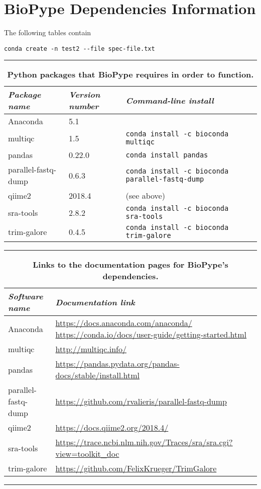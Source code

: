 %
\section{BioPype Dependencies Information}
The following tables contain 

\verb|conda create -n test2 --file spec-file.txt|

%
\begin{table}[hbtp]
    \begin{maxipage}
    \caption{\textbf{Python packages that BioPype requires in order to function.}}
    \hrule
    \begin{tabular}{ l | l | l l }
        \textit{Package name} & \textit{Version number} & \textit{Command-line install} \\ 
        \hline
        Anaconda & 5.1 &  \\  
        multiqc & 1.5 & \verb|conda install -c bioconda multiqc| \\
        pandas & 0.22.0 & \verb|conda install pandas| \\
        parallel-fastq-dump & 0.6.3 & \verb|conda install -c bioconda parallel-fastq-dump| \\
        qiime2 & 2018.4 & (see above) \\
        sra-tools & 2.8.2 & \verb|conda install -c bioconda sra-tools| \\
        trim-galore & 0.4.5 & \verb|conda install -c bioconda trim-galore| & \\
    \end{tabular}
    \label{tab:software}
    \label{software}
    \hrule
    \end{maxipage}
\end{table}
%
\begin{table}[hbtp]
\begin{maxipage}
\caption{\textbf{Links to the documentation pages for BioPype's dependencies.}}
\begin{tabular}{ l | p{12.25cm} }
\textit{Software name} & \textit{Documentation link} \\
\hline
Anaconda & \url{https://docs.anaconda.com/anaconda/} \newline \url{https://conda.io/docs/user-guide/getting-started.html} \\
multiqc & \url{http://multiqc.info/} \\
pandas & \url{https://pandas.pydata.org/pandas-docs/stable/install.html} \\
parallel-fastq-dump & \url{https://github.com/rvalieris/parallel-fastq-dump} \\
qiime2 & \url{https://docs.qiime2.org/2018.4/} \\
sra-tools & \url{https://trace.ncbi.nlm.nih.gov/Traces/sra/sra.cgi?view=toolkit_doc} \\
trim-galore &  \url{https://github.com/FelixKrueger/TrimGalore} \\
\end{tabular}
\label{tab:software-doc-links}
\hrule
\end{maxipage}
\end{table}%



